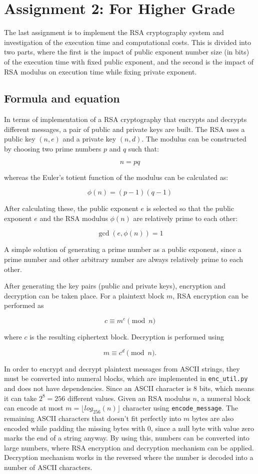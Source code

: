 \documentclass[11pt,a4paper]{article}
\begin{document}
\section*{Assignment 2: For Higher Grade}

The last assignment is to implement the RSA cryptography system and investigation of the execution time and computational costs. This is divided into two parts, where the first is the impact of public exponent number size (in bits) of the execution time with fixed public exponent, and the second is the impact of RSA modulus on execution time while fixing private exponent.

\subsection*{Formula and equation}

In terms of implementation of a RSA cryptography that encrypts and decrypts different messages, a pair of public and private keys are built. The RSA uses a public key $(n, e)$ and a private key $(n, d)$. The modulus can be constructed by choosing two prime numbers $p$ and $q$ such that:

$$ n = pq $$

whereas the Euler's totient function of the modulus can be calculated as:

$$ \phi(n) = (p-1)(q-1) $$

After calculating these, the public exponent $e$ is selected so that the public exponent $e$ and the RSA modulus $\phi(n)$ are relatively prime to each other:

$$ \gcd(e,\phi(n))=1 $$

A simple solution of generating a prime number as a public exponent, since a prime number and other arbitrary number are always relatively prime to each other.

After generating the key pairs (public and private keys), encryption and decryption can be taken place. For a plaintext block $m$, RSA encryption can be performed as

$$ c \equiv m^e \pmod n $$

where $c$ is the resulting ciphertext block. Decryption is performed using

$$
m \equiv c^d \pmod n.
$$

In order to encrypt and decrypt plaintext messages from ASCII strings, they must be converted into numeral blocks, which are implemented in \texttt{enc\_util.py} and does not have dependencies. Since an ASCII character is 8 bits, which means it can take $2^8 = 256$ different values. Given an RSA modulus $n$, a numeral block can encode at most $m = \lfloor log_{256}(n) \rfloor$ character using \texttt{encode\_message}. The remaining ASCII characters that doesn't fit perfectly into $m$ bytes are also encoded while padding the missing bytes with 0, since a null byte with value zero marks the end of a string anyway. By using this, numbers can be converted into large numbers, where RSA encryption and decryption mechanism can be applied. Decryption mechanism works in the reversed where the number is decoded into a number of ASCII characters. 
\end{document}
